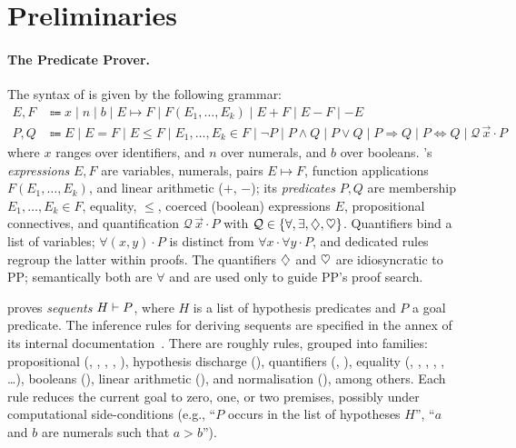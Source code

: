 \section{Preliminaries}\label{sec:prelim}

\paragraph{The Predicate Prover.}\label{sec:pp-syntax}
%
The syntax of \pp{} is given by the following grammar:
\begin{align*}
	E, F & \Coloneqq x \mid n \mid b \mid E \mapsto F \mid F(E_1,\ldots,E_k)
	\mid E + F \mid E - F \mid -E                                     \\
	P, Q & \Coloneqq E \mid E = F \mid E \leq F
	\mid E_1,\ldots,E_k \in F
	\mid \lnot P \mid P \land Q \mid P \lor Q \mid P \Rightarrow Q
	\mid P \Leftrightarrow Q
	\mid \mathcal{Q}\,\vec{x} \cdot P
\end{align*}
where $x$ ranges over identifiers, and $n$ over numerals, and $b$ over booleans.
%
\pp's \emph{expressions} $E, F$ are variables, numerals, pairs $E \mapsto F$,
function applications $F(E_1,\ldots,E_k)$, and linear arithmetic ($+$, $-$);
its \emph{predicates} $P, Q$ are membership $E_1,\ldots,E_k \in F$, equality,
$\leq$, coerced (boolean) expressions $E$, propositional connectives,
and quantification $\mathcal{Q}\,\vec{x} \cdot P$ with
$\mathcal{Q} \in \{\forall, \exists, \diamondsuit, \heartsuit\}$.
%
Quantifiers bind a list of variables; $\forall (x,y) \cdot P$ is distinct from
$\forall x \cdot \forall y \cdot P$, and dedicated rules regroup the latter
within proofs.
%
The quantifiers $\diamondsuit$ and $\heartsuit$ are idiosyncratic to PP; semantically both
are $\forall$ and are used only to guide PP's proof search.

\pp{} proves \emph{sequents} $H \vdash P$, where $H$ is a list of
hypothesis predicates and $P$ a goal predicate.
%
The inference rules for deriving sequents are specified in the annex of its
internal documentation~\cite{pp_spec}.
%
There are roughly \numRulesSpec{} rules, grouped into families:
propositional (, , , ,
), hypothesis discharge (), quantifiers
(, ), equality
(, , , , , \ldots), booleans
(), linear arithmetic (),
and normalisation (), among others.
%
Each rule reduces the current goal to zero, one, or two
premises, possibly under computational side-conditions
(e.g., ``$P$ occurs in the list of hypotheses $H$'',
``$a$ and $b$ are numerals such that $a > b$'').

